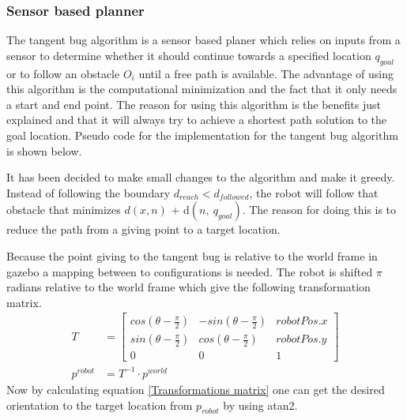 \documentclass[../Head/Main.tex]{subfiles}
\begin{document}
\subsubsection{Sensor based planner}
The tangent bug algorithm is a sensor based planer which relies on inputs from a sensor to determine whether it should continue towards a  specified location $q_{goal}$ or to follow an obstacle $O_i$ until a free path is available. The advantage of using this algorithm is the computational minimization and the fact that it only needs a start and end point. The reason for using this algorithm is the benefits just explained and that it will always try to achieve a shortest path solution to the goal location. Pseudo code for the implementation for the tangent bug algorithm is shown below.        

It has been decided to make small changes to the algorithm and make it greedy. Instead of following the boundary $d_{reach} < d_{followed}$, the robot will follow that obstacle that minimizes ${d(x,n)}$ + d$\left(n,~q_{goal}\right)$. The reason for doing this is to reduce the path from a giving point to a target location. \par
Because the point giving to the tangent bug is relative to the world frame in gazebo a mapping between to configurations is needed. The robot is shifted $\pi$ radians relative to the world frame which give the following transformation matrix.
\begin{align}
	T &= \begin{bmatrix} 
	   cos(\theta-\frac{\pi}{2}) &  -sin(\theta-\frac{\pi}{2}) & robotPos.x \\ 
	    sin(\theta-\frac{\pi}{2}) &  cos(\theta-\frac{\pi}{2}) & robotPos.y \\
	    0 & 0 & 1					
	\end{bmatrix} \\
	p^{robot} &= T^{-1} \cdot {p^{world}} \label{Transformations matrix}
\end{align}
Now by calculating equation \ref{Transformations matrix} one can get the desired orientation to the target location from $p_{robot}$ by using atan2.
\end{document}
